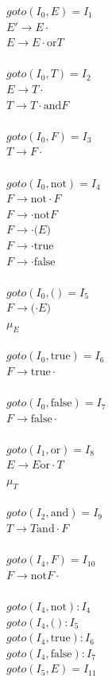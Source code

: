 \documentclass{article}
\begin{document}
$goto(I_0, E) = I_1$\\
$E' \to E \cdot$\\
$E \to E\cdot \text{or} T$\\\\
$goto(I_0, T) = I_2$\\
$E\to T\cdot$\\
$T\to T \cdot \text{and}F$\\\\
$goto(I_0, F) = I_3$\\
$T\to F\cdot$\\\\
$goto(I_0, \text{not}) = I_4$\\
$F\to \text{not}\cdot F$\\
$F\to \cdot \text{not} F$\\
$F\to \cdot \lparen E \rparen $\\
$F\to \cdot \text{true}$\\
$F\to \cdot \text{false}$\\\\
$goto(I_0, \lparen) = I_5$\\
$F\to \lparen \cdot E \rparen$\\
$\mu_{E}$\\\\
$goto(I_0, \text{true}) = I_6$\\
$F\to \text{true} \cdot $\\\\
$goto(I_0, \text{false}) = I_7$\\
$F\to \text{false}\cdot$\\\\
$goto(I_1, \text{or}) = I_8$\\
$E\to E \text{or} \cdot T$\\
$\mu_{T}$\\\\
$goto(I_2, \text{and}) = I_9$\\
$T\to T\text{and}\cdot F$\\\\
$goto(I_4, F) = I_{10}$\\
$F\to \text{not} F \cdot$\\\\
$goto(I_4, \text{not}) : I_{4}$\\
$goto(I_4, \lparen) : I_{5}$\\
$goto(I_4, \text{true}) : I_{6}$\\
$goto(I_4, \text{false}) : I_{7}$\\
$goto(I_5, E) = I_{11}$\\
\end{document}
